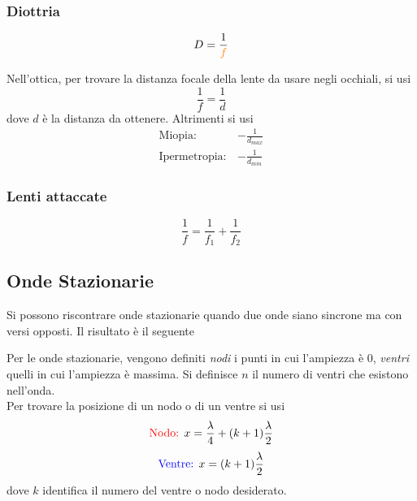 \subsubsection{Diottria}
\begin{equation*}
D = \frac{1}{\mathcolor{orange}{f}}
\end{equation*}

Nell'ottica, per trovare la distanza focale della lente da usare negli occhiali, si usi
\begin{equation*}
  \frac{1}{f} =  \frac{1}{d} 
\end{equation*}
dove $d$ è la distanza da ottenere. Altrimenti si usi
\begin{align*}
  \text{Miopia:}\,&-\frac{1}{d_{max}}\\
  \text{Ipermetropia:}\,&-\frac{1}{d_{min}} 
\end{align*}

\subsubsection{Lenti attaccate}
\begin{equation*}
\frac{1}{f} = \frac{1}{f_1}+\frac{1}{f_2}
\end{equation*}

\subsection{Onde Stazionarie}
Si possono riscontrare onde stazionarie quando due onde siano sincrone ma con versi opposti. Il 
risultato è il seguente

\begin{center}
\end{center}

Per le onde stazionarie, vengono definiti \emph{nodi} i punti in cui l'ampiezza è  $0$,
\emph{ventri} quelli in cui l'ampiezza è massima. Si definisce $n$ il numero di ventri che 
esistono nell'onda.\\
Per trovare la posizione di un nodo o di un ventre si usi
\begin{equation*}
  \mathcolor{red}{\text{Nodo: }} x = \frac{\lambda}{4}+(k+1)\frac{\lambda}{2}
\end{equation*}
\begin{equation*}
  \mathcolor{blue}{\text{Ventre: }} x = (k+1)\frac{\lambda}{2}
\end{equation*}
dove $k$ identifica il numero del ventre o nodo desiderato.

